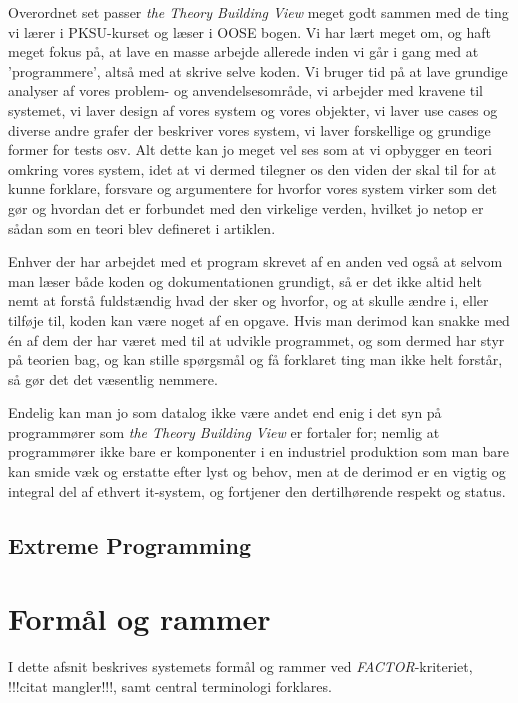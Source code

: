 \documentclass[11pt, a4paper]{article}
\begin{document}
Overordnet set passer \emph{the Theory Building View} meget godt sammen med de ting vi lærer i PKSU-kurset og læser i OOSE\cite{OOSE} bogen. Vi har lært meget om, og haft meget fokus på, at lave en masse arbejde allerede inden vi går i gang med at 'programmere', altså med at skrive selve koden. Vi bruger tid på at lave grundige analyser af vores problem- og anvendelsesområde, vi arbejder med kravene til systemet, vi laver design af vores system og vores objekter, vi laver use cases og diverse andre grafer der beskriver vores system, vi laver forskellige og grundige former for tests osv. Alt dette kan jo meget vel ses som at vi opbygger en teori omkring vores system, idet at vi dermed tilegner os den viden der skal til for at kunne forklare, forsvare og argumentere for hvorfor vores system virker som det gør og hvordan det er forbundet med den virkelige verden, hvilket jo netop er sådan som en teori blev defineret i artiklen.

Enhver der har arbejdet med et program skrevet af en anden ved også at selvom man læser både koden og dokumentationen grundigt, så er det ikke altid helt nemt at forstå fuldstændig hvad der sker og hvorfor, og at skulle ændre i, eller tilføje til, koden kan være noget af en opgave. Hvis man derimod kan snakke med én af dem der har været med til at udvikle programmet, og som dermed har styr på teorien bag, og kan stille spørgsmål og få forklaret ting man ikke helt forstår, så gør det det væsentlig nemmere.

Endelig kan man jo som datalog ikke være andet end enig i det syn på programmører som \emph{the Theory Building View} er fortaler for; nemlig at programmører ikke bare er komponenter i en industriel produktion som man bare kan smide væk og erstatte efter lyst og behov, men at de derimod er en vigtig og integral del af ethvert it-system, og fortjener den dertilhørende respekt og status.

\subsection{Extreme Programming}
\label{sub:extreme_programming}

\newpage

\section{Formål og rammer}
\label{sec:formal_og_rammer}
I dette afsnit beskrives systemets formål og rammer ved \textit{FACTOR}-kriteriet, !!!citat mangler!!!, samt central terminologi forklares.
\end{document}
